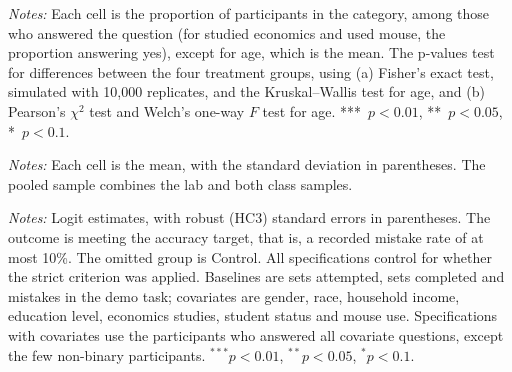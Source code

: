 \documentclass[12pt, letterpaper]{article}
\begin{document}
\begin{table}[htbp]
\centering
\caption{Covariates by treatment group (pooled sample)}\label{tab:covariates-sumstats-pooled}
\begin{threeparttable}

\begin{tablenotes}[flushleft]
\footnotesize
\item \textit{Notes:} Each cell is the proportion of participants in the category, among those who answered the question (for studied economics and used mouse, the proportion answering yes), except for age, which is the mean. The p-values test for differences between the four treatment groups, using (a) Fisher's exact test, simulated with 10,000 replicates, and the Kruskal--Wallis test for age, and (b) Pearson's $\chi^2$ test and Welch's one-way $F$ test for age. ***~$p<0.01$, **~$p<0.05$, *~$p<0.1$.
\end{tablenotes}
\end{threeparttable}
\end{table}

\begin{table}[htbp]
\centering
\caption{Slider task performance by sample and treatment group}\label{tab:slider-performance-sumstats}
\begin{threeparttable}

\begin{tablenotes}[flushleft]
\footnotesize
\item \textit{Notes:} Each cell is the mean, with the standard deviation in parentheses. The pooled sample combines the lab and both class samples.
\end{tablenotes}
\end{threeparttable}
\end{table}

\begin{table}[htbp]
\centering
\caption{Treatment effects on the probability of meeting the accuracy target (pooled sample, logit)}\label{tab:reg-target}
\begin{threeparttable}

\begin{tablenotes}[flushleft]
\footnotesize
\item \textit{Notes:} Logit estimates, with robust (HC3) standard errors in parentheses. The outcome is meeting the accuracy target, that is, a recorded mistake rate of at most 10\%. The omitted group is Control. All specifications control for whether the strict criterion was applied. Baselines are sets attempted, sets completed and mistakes in the demo task; covariates are gender, race, household income, education level, economics studies, student status and mouse use. Specifications with covariates use the participants who answered all covariate questions, except the few non-binary participants. $^{***}p<0.01$, $^{**}p<0.05$, $^{*}p<0.1$.
\end{tablenotes}
\end{threeparttable}
\end{table}
\end{document}

